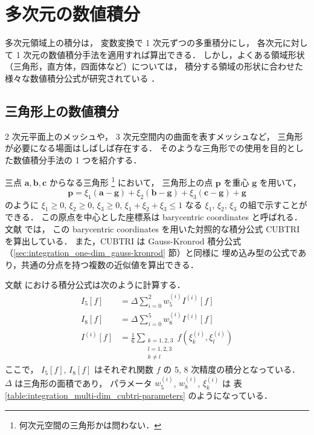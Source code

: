 %

\chapter{多次元の数値積分}

多次元領域上の積分は，
変数変換で 1 次元ずつの多重積分にし，
各次元に対して 1 次元の数値積分手法を適用すれば算出できる．
しかし，よくある領域形状（三角形，直方体，四面体など）については，
積分する領域の形状に合わせた様々な数値積分公式が研究されている
\cite{Cools1993}．

\section{三角形上の数値積分}

2 次元平面上のメッシュや，
3 次元空間内の曲面を表すメッシュなど，
三角形が必要になる場面はしばしば存在する．
そのような三角形での使用を目的とした数値積分手法の 1 つを紹介する．

三点 $\bm{a}, \bm{b}, \bm{c}$ からなる三角形
\footnote{何次元空間の三角形かは問わない．}
において，
三角形上の点 $\bm{p}$ を重心 $\bm{g}$ を用いて，
\begin{equation}
    \bm{p} = \xi_1 (\bm{a} - \bm{g}) + \xi_2 (\bm{b} - \bm{g}) + \xi_3 (\bm{c} - \bm{g}) + \bm{g}
\end{equation}
のように
$\xi_1 \ge 0$,
$\xi_2 \ge 0$,
$\xi_3 \ge 0$,
$\xi_1 + \xi_2 + \xi_3 \le 1$
なる $\xi_1$, $\xi_2$, $\xi_3$ の組で示すことができる．
この原点を中心とした座標系は barycentric coordinates と呼ばれる．
文献 \cite{Laurie1982} では，
この barycentric coordinates を用いた対照的な積分公式 CUBTRI を算出している．
また，CUBTRI は Gauss-Kronrod 積分公式（\ref{sec:integration_one-dim_gauss-kronrod} 節）と同様に
埋め込み型の公式であり，共通の分点を持つ複数の近似値を算出できる．

文献 \cite{Laurie1982} における積分公式は次のように計算する．
\begin{align}
    I_5[f]     & = \Delta \sum_{i=0}^2 w_5^{(i)} I^{(i)}[f] \\
    I_8[f]     & = \Delta \sum_{i=0}^5 w_8^{(i)} I^{(i)}[f] \\
    I^{(i)}[f] & = \frac{1}{6} \sum_{\substack{k = 1, 2, 3  \\ l = 1, 2, 3 \\ k \neq l}}
    f(\xi_k^{(i)}, \xi_l^{(i)})
\end{align}
ここで，
$I_5[f]$, $I_8[f]$ はそれぞれ関数 $f$ の 5, 8 次精度の積分となっている．
$\Delta$ は三角形の面積であり，
パラメータ $w_5^{(i)}$, $w_8^{(i)}$, $\xi_k^{(i)}$ は
表 \ref{table:integration_multi-dim_cubtri-parameters} のようになっている．

